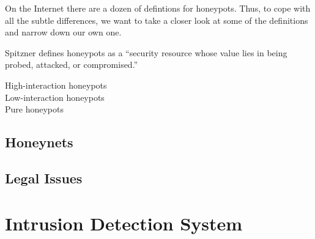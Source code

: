 On the Internet there are a dozen of defintions for honeypots. Thus, to cope with all the subtle differences, we want to take a closer look at some of the definitions and narrow down our own one.

Spitzner defines honeypots as a \enquote{security resource whose value lies in being probed, attacked, or compromised.}\cite{Spitzner2003}

High-interaction honeypots\\

Low-interaction honeypots\\

Pure honeypots\\



\subsection{Honeynets}

\cite{Spitzner2003}

\subsection{Legal Issues}

\cite{Spitzner2003}

\section{Intrusion Detection System}
